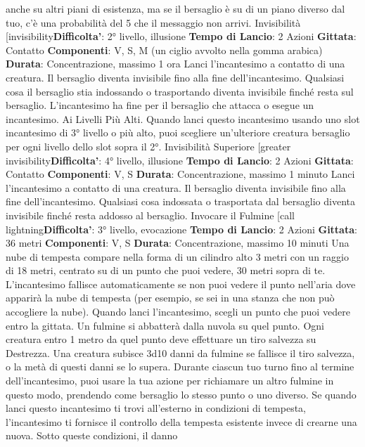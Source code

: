 \begin{multicols}{2}
anche su altri piani di esistenza, ma se il bersaglio è su
di un piano diverso dal tuo, c’è una probabilità del 5%
che il messaggio non arrivi.
Invisibilità
[invisibility\textbf{Difficolta'}:
2° livello, illusione
\textbf{Tempo di Lancio}: 2 Azioni
\textbf{Gittata}: Contatto
\textbf{Componenti}: V, S, M (un ciglio avvolto nella gomma
arabica)
\textbf{Durata}: Concentrazione, massimo 1 ora
Lanci l’incantesimo a contatto di una creatura. Il
bersaglio diventa invisibile fino alla fine
dell’incantesimo. Qualsiasi cosa il bersaglio stia
indossando o trasportando diventa invisibile finché
resta sul bersaglio. L’incantesimo ha fine per il
bersaglio che attacca o esegue un incantesimo.
Ai Livelli Più Alti. Quando lanci questo incantesimo
usando uno slot incantesimo di 3° livello o più alto, puoi
scegliere un’ulteriore creatura bersaglio per ogni livello
dello slot sopra il 2°.
Invisibilità Superiore
[greater invisibility\textbf{Difficolta'}:
4° livello, illusione
\textbf{Tempo di Lancio}: 2 Azioni
\textbf{Gittata}: Contatto
\textbf{Componenti}: V, S
\textbf{Durata}: Concentrazione, massimo 1 minuto
Lanci l’incantesimo a contatto di una creatura. Il
bersaglio diventa invisibile fino alla fine
dell’incantesimo. Qualsiasi cosa indossata o trasportata
dal bersaglio diventa invisibile finché resta addosso al
bersaglio.
Invocare il Fulmine
[call lightning\textbf{Difficolta'}:
3° livello, evocazione
\textbf{Tempo di Lancio}: 2 Azioni
\textbf{Gittata}: 36 metri
\textbf{Componenti}: V, S
\textbf{Durata}: Concentrazione, massimo 10 minuti
Una nube di tempesta compare nella forma di un
cilindro alto 3 metri con un raggio di 18 metri, centrato
su di un punto che puoi vedere, 30 metri sopra di te.
L’incantesimo fallisce automaticamente se non puoi
vedere il punto nell’aria dove apparirà la nube di
tempesta (per esempio, se sei in una stanza che non
può accogliere la nube).
Quando lanci l’incantesimo, scegli un punto che puoi
vedere entro la gittata. Un fulmine si abbatterà dalla
nuvola su quel punto. Ogni creatura entro 1 metro da
quel punto deve effettuare un tiro salvezza su
Destrezza. Una creatura subisce 3d10 danni da fulmine
se fallisce il tiro salvezza, o la metà di questi danni se lo
supera. Durante ciascun tuo turno fino al termine
dell’incantesimo, puoi usare la tua azione per
richiamare un altro fulmine in questo modo, prendendo
come bersaglio lo stesso punto o uno diverso.
Se quando lanci questo incantesimo ti trovi all’esterno
in condizioni di tempesta, l’incantesimo ti fornisce il
controllo della tempesta esistente invece di crearne una
nuova. Sotto queste condizioni, il danno

\end{multicols}
